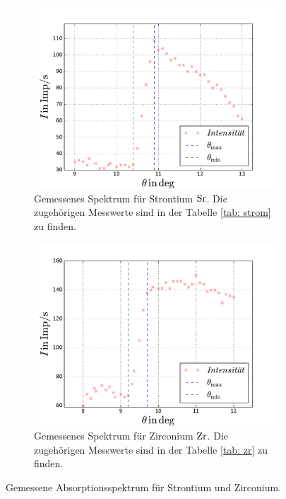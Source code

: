 \begin{figure}
  \centering
  \begin{subfigure}{0.48\textwidth}
    \centering
    \includegraphics[width=1 \textwidth]{../Messdaten/strom.pdf}
    \caption{Gemessenes Spektrum für Strontium $\ce{Sr}$. Die zugehörigen Messwerte sind in der Tabelle \ref{tab: strom} zu finden.}
    \label{fig: frank_hertz}
  \end{subfigure}
  \begin{subfigure}{0.48\textwidth}
    \centering
    \includegraphics[width=1 \textwidth]{../Messdaten/zr.pdf}
    \caption{Gemessenes Spektrum für Zirconium $\ce{Zr}$. Die zugehörigen Messwerte sind in der Tabelle \ref{tab: zr} zu finden.} %
    \label{fig: enrgie_hot}
  \end{subfigure}
  \caption{Gemessene Absorptionsspektrum für Strontium und Zirconium.}
  \label{fig: spektrum_strontium_zirconium}
\end{figure}
